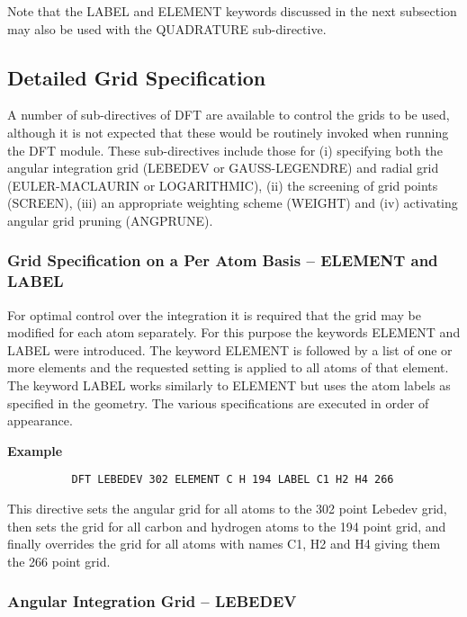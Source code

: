 \documentclass[11pt,fleqn]{article}
\begin{document}
Note that the LABEL and ELEMENT keywords discussed in the next subsection
may also be used with the QUADRATURE sub-directive.


\subsection{Detailed Grid Specification}

A number of sub-directives of DFT are available to control the grids to
be used, although it is not expected that these would be routinely
invoked when running the DFT module. These sub-directives include those
for (i) specifying both the angular integration grid (LEBEDEV or
GAUSS-LEGENDRE) and radial grid (EULER-MACLAURIN or LOGARITHMIC), 
(ii) the screening of grid points (SCREEN), 
(iii) an appropriate weighting scheme (WEIGHT) and
(iv) activating angular grid pruning (ANGPRUNE).


\subsubsection{Grid Specification on a Per Atom Basis -- ELEMENT and LABEL}

For optimal control over the integration it is required that the grid
may be modified for each atom separately. For this purpose the 
keywords ELEMENT and LABEL were introduced. The keyword ELEMENT is 
followed by a list of one or more elements and the requested setting
is applied to all atoms of that element. The keyword LABEL works 
similarly to ELEMENT but uses the atom labels as specified in the
geometry. The various specifications are executed in order of
appearance.

{\bf Example}

{
\footnotesize
\begin{verbatim}
          DFT LEBEDEV 302 ELEMENT C H 194 LABEL C1 H2 H4 266
\end{verbatim}
}
This directive sets the angular grid for all atoms to the 302 point 
Lebedev grid, then sets the grid for all carbon and hydrogen atoms to 
the 194 point grid, and finally overrides the grid for all atoms with 
names C1, H2 and H4 giving them the 266 point grid.


\subsubsection{Angular Integration Grid -- LEBEDEV}
\end{document}
